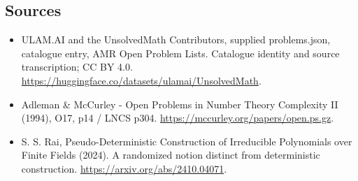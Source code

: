\documentclass[11pt,a4paper]{article}
\begin{document}
\subsection{Sources}
\begin{itemize}
\item[S1] ULAM.AI and the UnsolvedMath Contributors, supplied problems.json, catalogue entry, AMR Open Problem Lists. Catalogue identity and source transcription; CC BY 4.0.
\url{https://huggingface.co/datasets/ulamai/UnsolvedMath}.
\item[S2] Adleman \& McCurley - Open Problems in Number Theory Complexity II (1994), O17, p14 / LNCS p304. 
\url{https://mccurley.org/papers/open.ps.gz}.
\item[S3] S. S. Rai, Pseudo-Deterministic Construction of Irreducible Polynomials over Finite Fields (2024). A randomized notion distinct from deterministic construction.
\url{https://arxiv.org/abs/2410.04071}.
\end{itemize}
\end{document}
